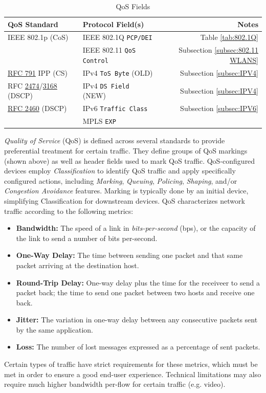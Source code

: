 \documentclass[12pt]{article}
\newcommand{\rfc}[1]{\href{https://datatracker.ietf.org/doc/html/rfc#1}{#1}}
\newcommand{\RFC}[1]{\href{https://datatracker.ietf.org/doc/html/rfc#1}{RFC #1}}
\begin{document}
	\begin{table}[H]
	\centering
	\caption{QoS Fields \label{tab:QOS FIELDS}}
	\begin{tabular}{llr}
	\hline
	\textbf{QoS Standard} 			& \textbf{Protocol Field(s)}		& \textbf{Notes}\\\hline
	IEEE 802.1p (CoS)				& IEEE 802.1Q \texttt{PCP/DEI} 	& Table \ref{tab:802.1Q}\\\hline
							& IEEE 802.11 \texttt{QoS Control} 	& Subsection \ref{subsec:802.11 WLANS}\\\hline
	\RFC{791} IPP (CS)			& IPv4 \texttt{ToS Byte} (OLD) 	& Subsection \ref{subsec:IPV4}\\
	RFC \rfc{2474}/\rfc{3168} (DSCP)	& IPv4 \texttt{DS Field} (NEW) 	& Subsection \ref{subsec:IPV4}\\\hline
	\RFC{2460} (DSCP)			& IPv6 \texttt{Traffic Class} 		& Subsection \ref{subsec:IPV6}\\\hline
							& MPLS \texttt{EXP}\\\hline
	\end{tabular}\end{table}
	\textit{Quality of Service} (QoS) is defined across several standards to provide preferential treatment for certain traffic. They define groups of QoS markings (shown above) as well as header fields used to mark QoS traffic. QoS-configured devices employ \textit{Classification} to identify QoS traffic and apply specifically configured actions, including \textit{Marking}, \textit{Queuing}, \textit{Policing}, \textit{Shaping}, and/or \textit{Congestion Avoidance} features. Marking is typically done by an initial device, simplifying Classification for downstream devices. QoS characterizes network traffic according to the following metrics:

	\begin{itemize}
		\label{itm:QOS METRICS}
		\item{\textbf{Bandwidth:} The speed of a link in \textit{bits-per-second} (bps), or the capacity of the link to send a number of bits per-second.}
		\item{\textbf{One-Way Delay:} The time between sending one packet and that same packet arriving at the destination host.}
		\item{\textbf{Round-Trip Delay:} One-way delay plus the time for the receiveer to send a packet back; the time to send one packet between two hosts and receive 					one back.}
		\item{\textbf{Jitter:} The variation in one-way delay between any consecutive packets sent by the same application.}
		\item{\textbf{Loss:} The number of lost messages expressed as a percentage of sent packets.}
	\end{itemize}
	Certain types of traffic have strict requirements for these metrics, which must be met in order to ensure a good end-user experience. Technical limitations may also require much higher bandwidth per-flow for certain traffic (e.g. video).
	
\end{document}
